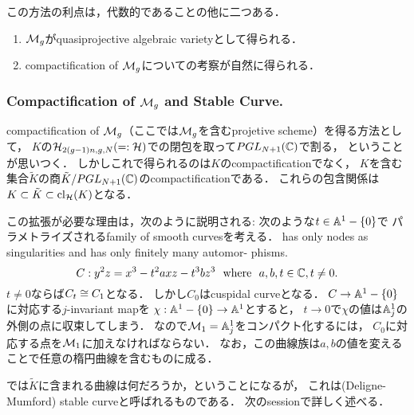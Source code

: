\documentclass[a4paper]{jsarticle}
\begin{document}
    この方法の利点は，代数的であることの他に二つある．
    \begin{enumerate}
        \item $\mathcal{M}_g$がquasiprojective algebraic varietyとして得られる．
        \item compactification of $\mathcal{M}_g$についての考察が自然に得られる．
    \end{enumerate}

    \subsubsection{Compactification of $\mathcal{M}_g$ and Stable Curve.}
    compactification of $\mathcal{M}_g$（ここでは$\mathcal{M}_g$を含むprojetive scheme）を得る方法として，
    $K$の$\mathcal{H}_{2(g-1)n, g, N}(=:\mathcal{H})$での閉包を取って$PGL_{N+1}(\mathbb{C})$で割る，
    ということが思いつく．
    しかしこれで得られるのは$K$のcompactificationでなく，
    $K$を含む集合$\tilde{K}$の商$\tilde{K}/PGL_{N+1}(\mathbb{C})$のcompactificationである．
    これらの包含関係は$K \subset \tilde{K} \subset \operatorname{cl}_{\mathcal{H}}(K)$となる．
    
    この拡張が必要な理由は，次のように説明される:
    次のような$t \in \mathbb{A}^1-\{0\}$で
    パラメトライズされるfamily of smooth curvesを考える．
    has only nodes as singularities and has only finitely many automor-
    phisms.
    \[ C: y^2z=x^3-t^2axz-t^3bz^3 ~~\text{where}~~ a,b,t \in \mathbb{C}, t \neq 0. \]
    $t \neq 0$ならば$C_t \cong C_1$となる．
    しかし$C_0$はcuspidal curveとなる．
    $C \to \mathbb{A}^1-\{0\}$に対応する$j$-invariant mapを
    $\chi: \mathbb{A}^1-\{0\} \to \mathbb{A}^1$とすると，
    $t \to 0$で$\chi$の値は$\mathbb{A}^1_j$の外側の点に収束してしまう．
    なので$\mathcal{M}_1=\mathbb{A}^1_j$をコンパクト化するには，
    $C_0$に対応する点を$\mathcal{M}_1$に加えなければならない．
    なお，この曲線族は$a,b$の値を変えることで任意の楕円曲線を含むものに成る．

    では$\tilde{K}$に含まれる曲線は何だろうか，ということになるが，
    これは(Deligne-Mumford) stable curveと呼ばれるものである．
    次のsessionで詳しく述べる．



\end{document}
